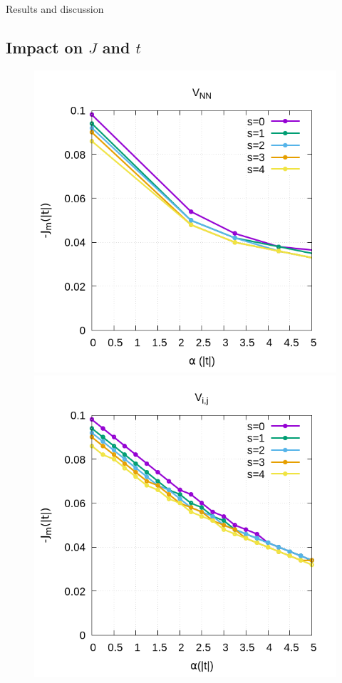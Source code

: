 \documentclass[12pt,twoside]{report}
\begin{document}
\begin{chapter}{Results and discussion}
	\subsection{Impact on $J$ and $t$}
	\begin{figure}[h!]
		\centering
		\hspace{-2cm}
		\begin{minipage}{0.4\textwidth}
			\includegraphics[scale=0.38]{J_vs_xrepv1.png}
		\end{minipage}
		\hspace{2cm}
		\begin{minipage}{0.4\textwidth}
			\includegraphics[scale=0.38]{J_vs_xrepvn.png}

\end{minipage}
\end{figure}
\end{chapter}
\end{document}
